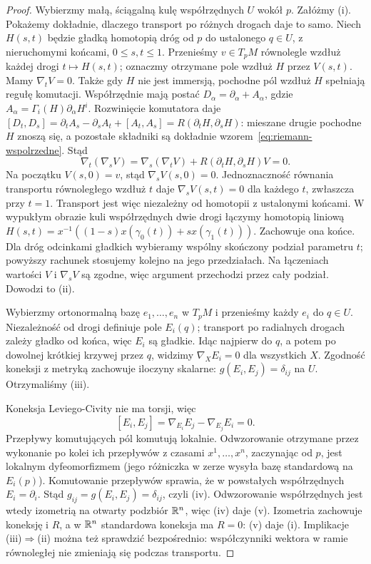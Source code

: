 \begin{proof}
Wybierzmy małą, ściągalną kulę współrzędnych $U$
wokół $p$. Załóżmy (i). Pokażemy dokładnie,
dlaczego transport po różnych drogach daje to samo.
Niech $H(s,t)$ będzie gładką homotopią dróg
od $p$ do ustalonego $q\in U$, z nieruchomymi
końcami, $0\leq s,t\leq1$. Przenieśmy
$v\in T_pM$ równolegle wzdłuż każdej drogi
$t\mapsto H(s,t)$; oznaczmy otrzymane pole
wzdłuż $H$ przez $V(s,t)$. Mamy $\nabla_tV=0$.
Także gdy $H$ nie jest immersją, pochodne pól wzdłuż
$H$ spełniają regułę komutacji. Współrzędnie mają
postać $D_\alpha=\partial_\alpha+A_\alpha$, gdzie
$A_\alpha=\Gamma_i(H)\partial_\alpha H^i$.
Rozwinięcie komutatora daje
$[D_t,D_s]=\partial_tA_s-\partial_sA_t+[A_t,A_s]
=R(\partial_tH,\partial_sH)$: mieszane drugie pochodne
$H$ znoszą się, a pozostałe składniki są dokładnie
wzorem~\eqref{eq:riemann-wspolrzedne}. Stąd
\[
 \nabla_t(\nabla_sV)
 =\nabla_s(\nabla_tV)+R(\partial_tH,\partial_sH)V=0.
\]
Na początku $V(s,0)=v$, stąd $\nabla_sV(s,0)=0$.
Jednoznaczność równania transportu równoległego
wzdłuż $t$ daje $\nabla_sV(s,t)=0$ dla każdego
$t$, zwłaszcza przy $t=1$. Transport jest więc
niezależny od homotopii z ustalonymi końcami.
W wypukłym obrazie kuli współrzędnych dwie drogi
łączymy homotopią liniową
$H(s,t)=x^{-1}((1-s)x(\gamma_0(t))+s x(\gamma_1(t)))$.
Zachowuje ona końce. Dla dróg odcinkami gładkich
wybieramy wspólny skończony podział parametru $t$;
powyższy rachunek stosujemy kolejno na jego przedziałach.
Na łączeniach wartości $V$ i $\nabla_sV$ są zgodne,
więc argument przechodzi przez cały podział. Dowodzi to (ii).

Wybierzmy ortonormalną bazę $e_1,\ldots,e_n$ w $T_pM$
i przenieśmy każdy $e_i$ do $q\in U$. Niezależność
od drogi definiuje pole $E_i(q)$; transport po
radialnych drogach zależy gładko od końca,
więc $E_i$ są gładkie. Idąc najpierw do $q$,
a potem po dowolnej krótkiej krzywej przez $q$,
widzimy $\nabla_XE_i=0$ dla wszystkich $X$.
Zgodność koneksji z metryką zachowuje iloczyny
skalarne: $g(E_i,E_j)=\delta_{ij}$ na $U$.
Otrzymaliśmy (iii).

Koneksja Leviego-Civity nie ma torsji, więc
\[
 [E_i,E_j]=\nabla_{E_i}E_j-\nabla_{E_j}E_i=0.
\]
Przepływy komutujących pól komutują lokalnie.
Odwzorowanie otrzymane przez wykonanie po kolei
ich przepływów z czasami $x^1,\ldots,x^n$,
zaczynając od $p$, jest lokalnym dyfeomorfizmem
(jego różniczka w zerze wysyła bazę standardową
na $E_i(p)$). Komutowanie przepływów sprawia,
że w powstałych współrzędnych $E_i=\partial_i$.
Stąd $g_{ij}=g(E_i,E_j)=\delta_{ij}$, czyli (iv).
Odwzorowanie współrzędnych jest wtedy izometrią
na otwarty podzbiór $\mathbb{R}^n$, więc (iv) daje (v).
Izometria zachowuje koneksję i $R$, a w $\mathbb{R}^n$
standardowa koneksja ma $R=0$: (v) daje (i).
Implikacje (iii)$\Rightarrow$(ii) można też
sprawdzić bezpośrednio: współczynniki wektora
w ramie równoległej nie zmieniają się podczas
transportu.


\end{proof}
